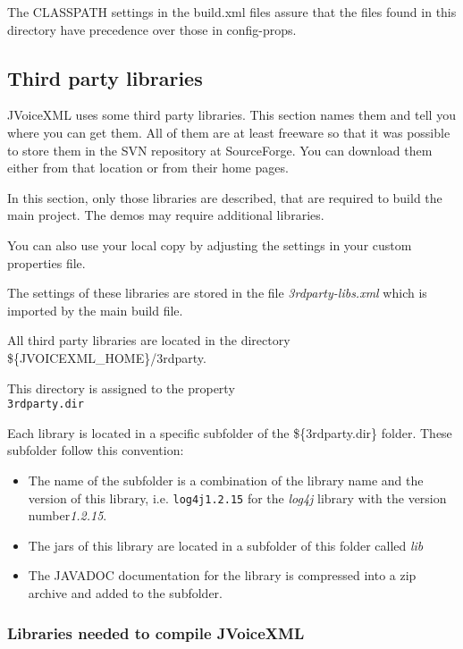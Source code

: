 \documentclass[11pt,a4paper]{article}
\begin{document}
The CLASSPATH settings in the build.xml files assure that the files
found in this directory have precedence over those in config-props.

\subsection{Third party libraries}
\label{sec:third-party-libr}

JVoiceXML uses some third party libraries. This section names them and tell
you where you can get them. All of them are at least freeware
so that it was possible to store them in the SVN repository at
SourceForge. You can download them either from that location or
from their home pages. 

In this section, only those libraries are described, that are required
to build the main project. The demos may require additional libraries.

You can also use your local copy by adjusting the settings in your
custom properties file.

The settings of these libraries are stored in the file \emph{3rdparty-libs.xml}
which is imported by the main build file.

All third party libraries are located in the directory \\
\$\{JVOICEXML\_HOME\}/3rdparty.

This directory is assigned to the property \\
\texttt{3rdparty.dir}

Each library is located in a specific subfolder of the \$\{3rdparty.dir\}
folder. These subfolder follow this convention:

\begin{itemize}
\item The name of the subfolder is a combination of the library name and
the version of this library, i.e. \texttt{log4j1.2.15} for the \emph{log4j}
library with the version number\emph{1.2.15}.
\item The jars of this library are located in a subfolder of this folder
called \emph{lib}
\item The JAVADOC documentation for the library is compressed into a zip
archive and added to the subfolder.
\end{itemize}

\subsubsection{Libraries needed to compile JVoiceXML}
\label{sec:libr-need-comp}
\end{document}
